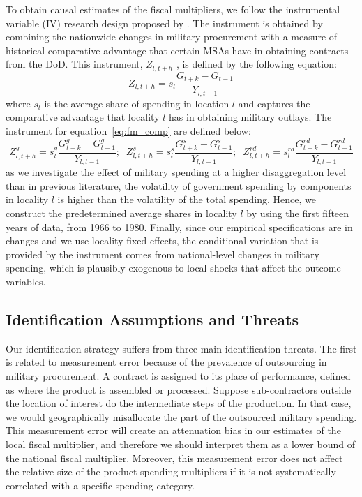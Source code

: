 \documentclass[dv_diss_main.tex]{subfiles}
\begin{document}
To obtain causal estimates of the fiscal multipliers, we follow the instrumental variable (IV) research design proposed by \cite{Nakamura2014}. The instrument is obtained by combining the nationwide changes in military procurement with a measure of historical-comparative advantage that certain MSAs have in obtaining contracts from the DoD. This instrument, $Z_{l,t+h}$ , is defined by the following equation:
\begin{equation}
    Z_{l,t+h} = s_{l} \frac{G_{t+k}-G_{t-1}}{Y_{l,t-1}}
    \label{eq:fm_iv}
\end{equation}
\noindent where $s_{l}$ is the average share of spending in location $l$ and captures the comparative advantage that locality $l$ has in obtaining military outlays. The instrument for equation~\eqref{eq:fm_comp} are defined below:
\begin{equation}
    Z_{l,t+h}^g = s_{l}^g \frac{G^g_{t+k}-G^g_{t-1}}{Y_{l,t-1}};\;\;Z_{l,t+h}^s = s_{l}^s \frac{G^s_{t+k}-G^s_{t-1}}{Y_{l,t-1}};\;\;Z_{l,t+h}^{rd} = s_{l}^{rd} \frac{G^{rd}_{t+k}-G^{rd}_{t-1}}{Y_{l,t-1}}
    \label{eq:fm_iv2}
\end{equation}
\noindent as we investigate the effect of military spending at a higher disaggregation level than in previous literature, the volatility of government spending by components in locality $l$ is higher than the volatility of the total spending. Hence, we construct the predetermined average shares in locality $l$ by using the first fifteen years of data, from 1966 to 1980. Finally, since our empirical specifications are in changes and we use locality fixed effects, the conditional variation that is provided by the instrument comes from national-level changes in military spending, which is plausibly exogenous to local shocks that affect the outcome variables.

\subsection{Identification Assumptions and Threats}

Our identification strategy suffers from three main identification threats. The first is related to measurement error because of the prevalence of outsourcing in military procurement. A contract is assigned to its place of performance, defined as where the product is assembled or processed. Suppose sub-contractors outside the location of interest do the intermediate steps of the production. In that case, we would geographically misallocate the part of the outsourced military spending. This measurement error will create an attenuation bias in our estimates of the local fiscal multiplier, and therefore we should interpret them as a lower bound of the national fiscal multiplier. Moreover, this measurement error does not affect the relative size of the product-spending multipliers if it is not systematically correlated with a specific spending category. 
\end{document}
